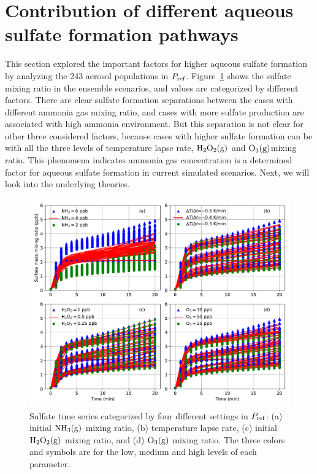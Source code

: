 \documentclass[edeposit,fullpage]{uiucthesis2009}
\begin{document}
\section{Contribution of different aqueous sulfate formation pathways}
\label{chap2.4}
This section explored the important factors for higher aqueous sulfate formation by analyzing the 243 aerosol populations in $P_{\rm ref}$.
Figure~\ref{chap2:ens_three} shows the sulfate mixing ratio in the ensemble scenarios, and values are categorized by different factors. There are clear sulfate formation separations between the cases with different ammonia gas mixing ratio, and cases with more sulfate production are associated with high ammonia environment. But this separation is not clear for other three considered factors, because cases with higher sulfate formation can be with all the three levels of temperature lapse rate, $\rm H_2O_2(g)$ and $\rm O_3(g)$mixing ratio. This phenomena indicates ammonia gas concentration is a determined factor for aqueous sulfate formation in current simulated scenarios. Next, we will look into the underlying theories.

\begin{figure}[ht]
    \centering \includegraphics[scale=0.6]{chap2_figs/chap2_fig2_mono_ensemble.pdf}
    \caption{Sulfate time series categorized by four different settings in $P_{\rm ref}$: (a) initial $\rm NH_3(g)$ mixing ratio, (b) temperature lapse rate, (c) initial $\rm H_2O_2(g)$ mixing ratio, and (d) $\rm O_3(g)$ mixing ratio. The three colors and symbols are for the low, medium and high levels of each parameter.}
    \label{chap2:ens_three}
\end{figure}
\end{document}
